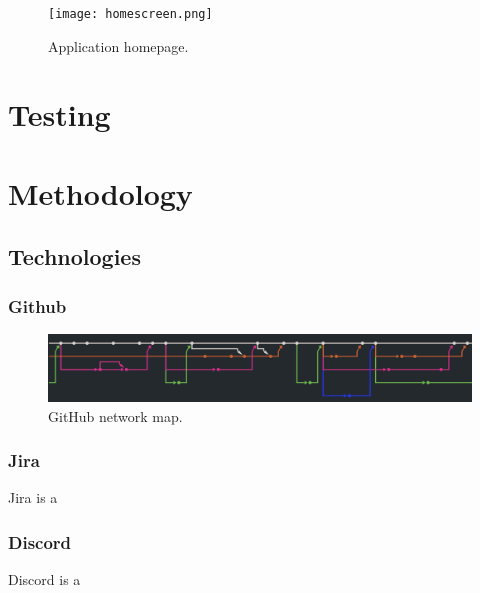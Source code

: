 \documentclass[conference]{IEEEtran}
\begin{document}

\begin{figure}[htbp]
\centerline{\texttt{[image: homescreen.png]}}
\caption{Application homepage.}
\label{fig}
\end{figure}

\section{Testing}



\section{Methodology}

\subsection{Technologies}
\subsubsection{Github}

\begin{figure}[htbp]
\centerline{\includegraphics[width = \linewidth]{github-network.png}}
\caption{GitHub network map.}
\label{fig}
\end{figure}

\subsubsection{Jira}
Jira is a 
\subsubsection{Discord}
Discord is a 

\end{document}
